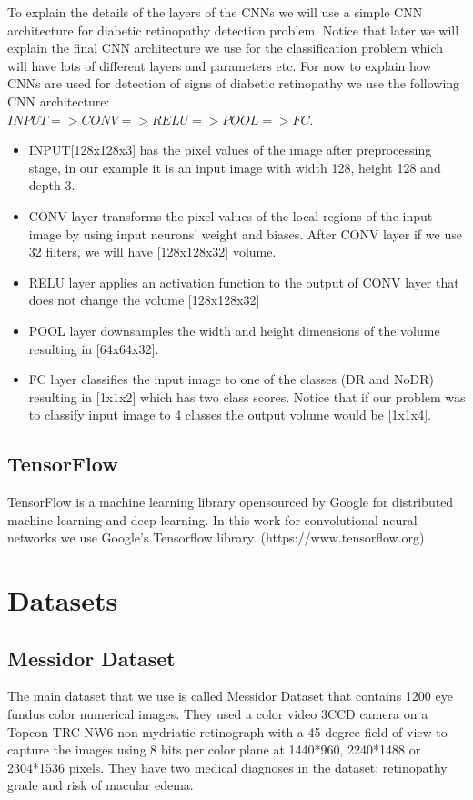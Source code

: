 To explain the details of the layers of the CNNs we will use a simple CNN architecture for diabetic retinopathy detection problem. Notice that later we will explain the final CNN architecture we use for the classification problem which will have lots of different layers and parameters etc. For now to explain how CNNs are used for detection of signs of diabetic retinopathy we use the following CNN architecture:\\ 
${INPUT => CONV => RELU => POOL => FC}$. 

\begin{itemize}
    \item INPUT[128x128x3] has the pixel values of the image after preprocessing stage, in our example it is an input image with width 128, height 128 and depth 3.
    \item CONV layer transforms the pixel values of the local regions of the input image by using input neurons' weight and biases. After CONV layer if we use 32 filters, we will have [128x128x32] volume.
    \item RELU layer applies an activation function to the output of CONV layer that does not change the volume [128x128x32]
    \item POOL layer downsamples the width and height dimensions of the volume resulting in [64x64x32].
    \item FC layer classifies the input image to one of the classes (DR and NoDR) resulting in [1x1x2] which has two class scores. Notice that if our problem was to classify input image to 4 classes the output volume would be [1x1x4].
\end{itemize}


\subsection{TensorFlow}
TensorFlow is a machine learning library opensourced by Google for distributed machine learning and deep learning. In this work for convolutional neural networks we use Google's Tensorflow library. (https://www.tensorflow.org) 

\section{Datasets}
\subsection{Messidor Dataset}
The main dataset that we use is called Messidor Dataset \citep{decenciere2014feedback} that contains 1200 eye fundus color numerical images. They used a color video 3CCD camera on a Topcon TRC NW6 non-mydriatic retinograph with a 45 degree field of view to capture the images using 8 bits per color plane at 1440*960, 2240*1488 or 2304*1536 pixels. 
They have two medical diagnoses in the dataset: retinopathy grade and risk of macular edema. 


